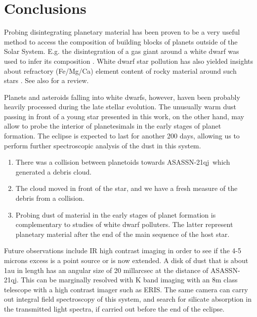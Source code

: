 \documentclass{aa}
\newcommand{\asas}{ASASSN-21qj}
\begin{document}


\section{Conclusions}\label{sec:conclusion}

Probing disintegrating planetary material has been proven to be a very useful method to access the composition of building blocks of planets outside of the Solar System.
%
E.g. the disintegration of a gas giant around a white dwarf was used to infer its composition \citep{Gaensike2019}.
%
White dwarf star pollution has also yielded insights about refractory (Fe/Mg/Ca) element content of rocky  material around such stars \citep{Turner2020,Putirka2021,Blouin2020}.
%
See also \cite{Veras2021} for a review.

Planets and asteroids falling into white dwarfs, however, haven been probably heavily processed during the late stellar evolution.
%
The unusually warm dust passing in front of a young star presented in this work, on the other hand, may allow to probe the interior of planetesimals in the early stages of planet formation.
%
The eclipse is expected to last for another 200 days, allowing us to perform further spectroscopic analysis of the dust in this system.

   \begin{enumerate}
      \item There was a collision between planetoids towards \asas\ which generated a debris cloud.
      \item The cloud moved in front of the star, and we have a fresh measure of the debris from a collision.
     \item Probing dust of material in the early stages of planet formation is complementary to studies of white dwarf polluters.
    The latter represent planetary material after the end of the main sequence of the host star.
   \end{enumerate}


Future observations include IR high contrast imaging in order to see if the 4-5 microns excess is a point source or is now extended.
%
A disk of dust that is about 1au in length has an angular size of 20 millarcsec at the distance of \asas .
%
This can be marginally resolved with K band imaging with an 8m class telescope with a high contrast imager such as ERIS.
%
The same camera can carry out integral field spectroscopy of this system, and search for silicate absorption in the transmitted light spectra, if carried out before the end of the eclipse.
\end{document}
